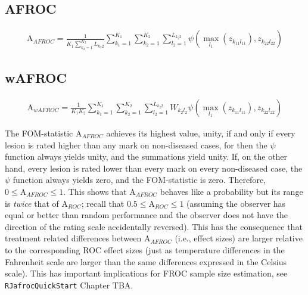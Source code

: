 \documentclass[
]{book}
\begin{document}
\hypertarget{afroc}{%
\subsection{AFROC}\label{afroc}}

\begin{equation}
\begin{aligned}
\text{A}_{AFROC} = \frac{1}{K_1\sum_{k_2=1}^{K_2}L_{k_2 2}}\sum_{k_1=1}^{K_1}\sum_{k_2=1}^{K_2}\sum_{l_2=1}^{L_{k_2 2}} \psi\left ( \max_{l_1}\left (z_{k_11l_11}  \right ),z_{k_22l_22} \right )
\end{aligned}
\label{eq:empirical-computational-afroc}
\end{equation}

\hypertarget{wafroc}{%
\subsection{wAFROC}\label{wafroc}}

\begin{equation}
\begin{aligned}
\text{A}_{wAFROC} = \frac{1}{K_1K_2}\sum_{k_1=1}^{K_1}\sum_{k_2=1}^{K_2}\sum_{l_2=1}^{L_{k_2 2}} W_{k_2l_2}\psi\left ( \max_{l_1}\left (z_{k_11l_11}  \right ),z_{k_22l_22} \right )
\end{aligned}
\label{eq:empirical-computational-wafroc}
\end{equation}

The FOM-statistic \(\text{A}_{AFROC}\) achieves its highest value, unity, if and only if every lesion is rated higher than any mark on non-diseased cases, for then the \(\psi\) function always yields unity, and the summations yield unity. If, on the other hand, every lesion is rated lower than every mark on every non-diseased case, the \(\psi\) function always yields zero, and the FOM-statistic is zero. Therefore, \(0 \leq \text{A}_{AFROC} \leq 1\).
This shows that \(\text{A}_{AFROC}\) behaves like a probability but its range is \emph{twice} that of \(\text{A}_{ROC}\); recall that \(0.5 \leq \text{A}_{ROC} \leq 1\) (assuming the observer has equal or better than random performance and the observer does not have the direction of the rating scale accidentally reversed). This has the consequence that treatment related differences between \(\text{A}_{AFROC}\) (i.e., effect sizes) are larger relative to the corresponding ROC effect sizes (just as temperature differences in the Fahrenheit scale are larger than the same differences expressed in the Celsius scale). This has important implications for FROC sample size estimation, see \texttt{RJafrocQuickStart} Chapter TBA.
\end{document}
